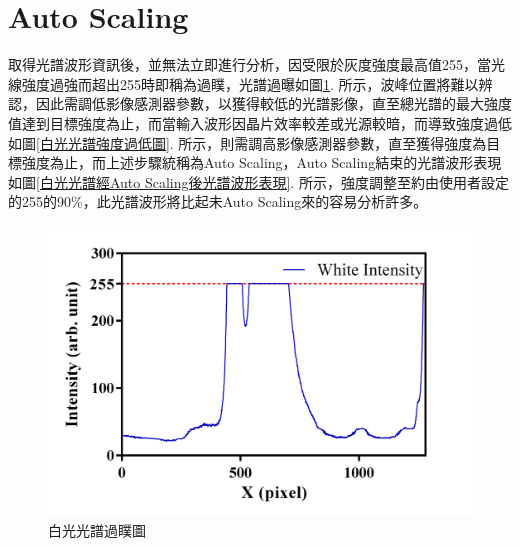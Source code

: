 \section{Auto Scaling}
取得光譜波形資訊後，並無法立即進行分析，因受限於灰度強度最高值255，當光線強度過強而超出255時即稱為過瞨\cite{over-exposure}，光譜過曝如圖\ref{白光光譜過瞨圖}. 所示，波峰位置將難以辨認，因此需調低影像感測器參數，以獲得較低的光譜影像，直至總光譜的最大強度值達到目標強度為止，而當輸入波形因晶片效率較差或光源較暗，而導致強度過低如圖\ref{白光光譜強度過低圖}. 所示，則需調高影像感測器參數，直至獲得強度為目標強度為止，而上述步驟統稱為Auto Scaling，Auto Scaling結束的光譜波形表現如圖\ref{白光光譜經Auto Scaling後光譜波形表現}. 所示，強度調整至約由使用者設定的255的90\%，此光譜波形將比起未Auto Scaling來的容易分析許多。
\newpage
\begin{figure}[H] %
	\centering %
	\setlength{\abovecaptionskip}{0.cm}
	\includegraphics[width=\textwidth]{figures/White_Over.PNG} %
	\caption{白光光譜過瞨圖} %
	\label{白光光譜過瞨圖} %
\end{figure}
